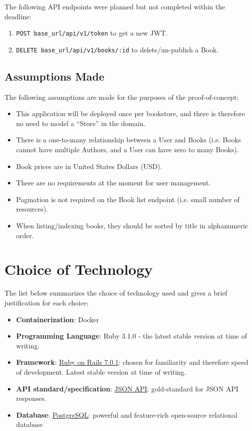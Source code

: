 \documentclass[a4paper]{article}
\begin{document}
The following API endpoints were planned but not completed within the deadline:

\begin{enumerate}
  \item \texttt{POST base\_url/api/v1/token} to get a new JWT.
  \item \texttt{DELETE base\_url/api/v1/books/:id} to delete/un-publish a Book.
\end{enumerate}

\subsection{Assumptions Made}
\label{sec:assumptions}

The following assumptions are made for the purposes of the proof-of-concept:

\begin{itemize}
  \item This application will be deployed once per bookstore, and there is
  therefore no need to model a ``Store'' in the domain.
  \item There is a one-to-many relationship between a User and Books (i.e. Books
  cannot have multiple Authors, and a User can have zero to many Books).
  \item Book prices are in United States Dollars (USD).
  \item There are no requirements at the moment for user management.
  \item Pagination is not required on the Book list endpoint (i.e. small number
  of resources).
  \item When listing/indexing books, they should be sorted by title in
  alphanumeric order.
\end{itemize}

\section{Choice of Technology}
\label{sec:technology}

The list below summarizes the choice of technology used and gives a brief
justification for each choice:

\begin{itemize}
  \item \textbf{Containerization}: Docker
  \item \textbf{Programming Language}: Ruby 3.1.0 - the latest stable version at time of writing.
  \item \textbf{Framework}: \href{https://rubyonrails.org/}{Ruby on Rails 7.0.1}: chosen for familiarity and therefore speed of development. Latest stable version at time of writing.
  \item \textbf{API standard/specification}: \href{https://jsonapi.org/}{JSON API}: gold-standard for JSON API responses.
  \item \textbf{Database}: \href{https://www.postgresql.org/}{PostgreSQL}: powerful and feature-rich open-source relational database
\end{itemize}
\end{document}
